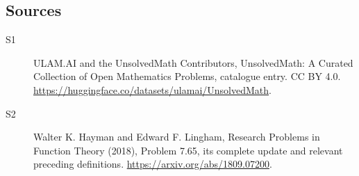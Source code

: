 \documentclass[11pt]{article}
\begin{document}
\subsection{Sources}
\begin{description}
\item[\hypertarget{source:statement:1}{S1}] ULAM.AI and the UnsolvedMath Contributors, UnsolvedMath: A Curated Collection of Open Mathematics Problems, catalogue entry. CC BY 4.0. \url{https://huggingface.co/datasets/ulamai/UnsolvedMath}.
\item[\hypertarget{source:statement:2}{S2}] Walter K. Hayman and Edward F. Lingham, Research Problems in Function Theory (2018), Problem 7.65, its complete update and relevant preceding definitions. \url{https://arxiv.org/abs/1809.07200}.
\end{description}
\label{end:statement}
\end{document}
